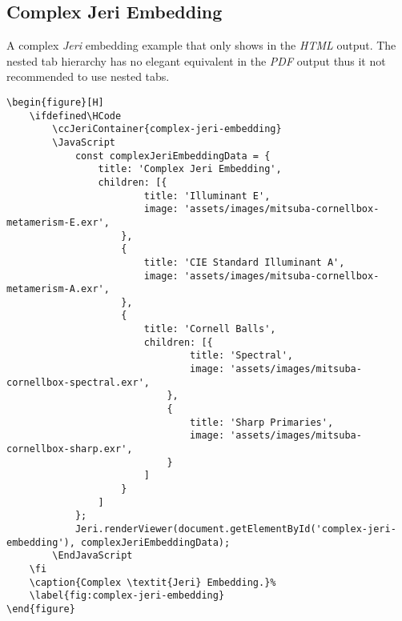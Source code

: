 \subsection*{Complex Jeri Embedding}%

A complex \textit{Jeri} embedding example that only shows in the \textit{HTML} output.
The nested tab hierarchy has no elegant equivalent in the \textit{PDF} output thus it not recommended to use nested tabs.

\begin{lstlisting}[caption={Complex \textit{Jeri} Embedding.}]
\begin{figure}[H]
    \ifdefined\HCode
        \ccJeriContainer{complex-jeri-embedding}
        \JavaScript
            const complexJeriEmbeddingData = {
                title: 'Complex Jeri Embedding',
                children: [{
                        title: 'Illuminant E',
                        image: 'assets/images/mitsuba-cornellbox-metamerism-E.exr',
                    },
                    {
                        title: 'CIE Standard Illuminant A',
                        image: 'assets/images/mitsuba-cornellbox-metamerism-A.exr',
                    },
                    {
                        title: 'Cornell Balls',
                        children: [{
                                title: 'Spectral',
                                image: 'assets/images/mitsuba-cornellbox-spectral.exr',
                            },
                            {
                                title: 'Sharp Primaries',
                                image: 'assets/images/mitsuba-cornellbox-sharp.exr',
                            }
                        ]
                    }
                ]
            };
            Jeri.renderViewer(document.getElementById('complex-jeri-embedding'), complexJeriEmbeddingData);
        \EndJavaScript
    \fi
    \caption{Complex \textit{Jeri} Embedding.}%
    \label{fig:complex-jeri-embedding}
\end{figure}
\end{lstlisting}


